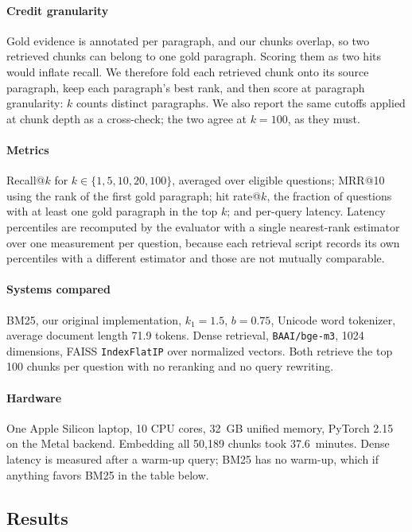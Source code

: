\documentclass[sigconf,nonacm]{acmart}
\begin{document}
\paragraph{Credit granularity} Gold evidence is annotated per paragraph, and our
chunks overlap, so two retrieved chunks can belong to one gold paragraph.
Scoring them as two hits would inflate recall. We therefore fold each retrieved
chunk onto its source paragraph, keep each paragraph's best rank, and then score
at paragraph granularity: $k$ counts distinct paragraphs. We also report the same
cutoffs applied at chunk depth as a cross-check; the two agree at $k = 100$, as
they must.

\paragraph{Metrics} Recall@$k$ for $k \in \{1, 5, 10, 20, 100\}$, averaged over
eligible questions; MRR@10 using the rank of the first gold paragraph; hit
rate@$k$, the fraction of questions with at least one gold paragraph in the top
$k$; and per-query latency. Latency percentiles are recomputed by the evaluator
with a single nearest-rank estimator over one measurement per question, because
each retrieval script records its own percentiles with a different estimator and
those are not mutually comparable.

\paragraph{Systems compared} BM25, our original implementation, $k_1 = 1.5$,
$b = 0.75$, Unicode word tokenizer, average document length 71.9 tokens. Dense
retrieval, \texttt{BAAI/bge-m3}, 1024 dimensions, FAISS \texttt{IndexFlatIP}
over normalized vectors. Both retrieve the top 100 chunks per question with no
reranking and no query rewriting.

\paragraph{Hardware} One Apple Silicon laptop, 10 CPU cores, 32~GB unified
memory, PyTorch 2.15 on the Metal backend. Embedding all 50{,}189 chunks took
37.6~minutes. Dense latency is measured after a warm-up query; BM25 has no
warm-up, which if anything favors BM25 in the table below.

\subsection{Results}
\end{document}
